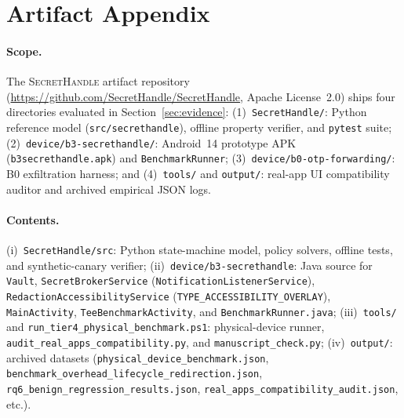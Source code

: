 \documentclass[sigconf,10pt]{acmart}
\newcommand{\SH}{\textsc{SecretHandle}}
\theoremstyle{acmplain}%
\begin{document}
\appendix
\section{Artifact Appendix}
\label{sec:artifact}

\paragraph{Scope.} The \SH{} artifact repository (\url{https://github.com/SecretHandle/SecretHandle}, Apache License~2.0) ships four directories evaluated in Section~\ref{sec:evidence}: (1)~\texttt{SecretHandle/}: Python reference model (\texttt{src/secrethandle}), offline property verifier, and \texttt{pytest} suite; (2)~\texttt{device/\allowbreak b3-secrethandle/}: Android~14 prototype APK (\texttt{b3secrethandle.apk}) and \texttt{BenchmarkRunner}; (3)~\texttt{device/\allowbreak b0-otp-forwarding/}: B0 exfiltration harness; and (4)~\texttt{tools/} and \texttt{output/}: real-app UI compatibility auditor and archived empirical JSON logs.

\paragraph{Contents.}
(i)~\texttt{SecretHandle/src}: Python state-machine model, policy solvers, offline tests, and synthetic-canary verifier;
(ii)~\texttt{device/\allowbreak b3-\allowbreak secrethandle}: Java source for \texttt{Vault}, \texttt{Secret\allowbreak Broker\allowbreak Service} (\texttt{Notification\allowbreak Listener\allowbreak Service}), \texttt{Redaction\allowbreak Accessibility\allowbreak Service} (\texttt{TYPE\_\allowbreak ACCESSIBILITY\_\allowbreak OVERLAY}), \texttt{MainActivity}, \texttt{Tee\allowbreak Benchmark\allowbreak Activity}, and \texttt{Benchmark\allowbreak Runner.java};
(iii)~\texttt{tools/} and \texttt{run\_\allowbreak tier4\_\allowbreak physical\_\allowbreak benchmark.ps1}: physical-device runner, \texttt{audit\_\allowbreak real\_\allowbreak apps\_\allowbreak compatibility.py}, and \texttt{manuscript\_\allowbreak check.py};
(iv)~\texttt{output/}: archived datasets (\texttt{physical\_\allowbreak device\_\allowbreak benchmark.json}, \texttt{benchmark\_\allowbreak overhead\_\allowbreak lifecycle\_\allowbreak redirection.json}, \texttt{rq6\_\allowbreak benign\_\allowbreak regression\_\allowbreak results.json}, \texttt{real\_\allowbreak apps\_\allowbreak compatibility\_\allowbreak audit.json}, etc.).
\end{document}

